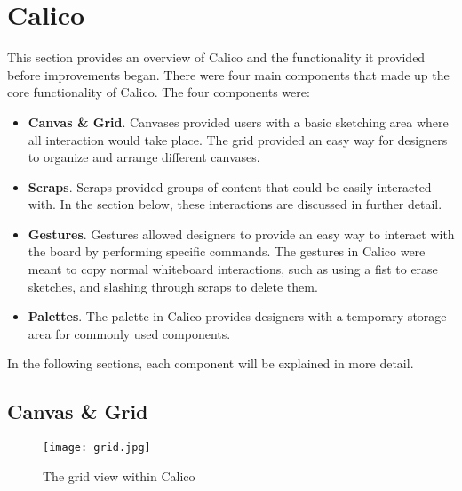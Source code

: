 \chapter{Calico}
This section provides an overview of Calico and the functionality it provided before improvements began. There were four main components that made up the core functionality of Calico. The four components were:

\begin{itemize}\itemsep1pt

\item
\textbf{Canvas \& Grid}. 
Canvases provided users with a basic sketching area where all interaction would take place. The grid provided an easy way for designers to organize and arrange different canvases.

\item
\textbf{Scraps}.
Scraps provided groups of content that could be easily interacted with. In the section below, these interactions are discussed in further detail.

\item
\textbf{Gestures}.
Gestures allowed designers to provide an easy way to interact with the board by performing specific commands. The gestures in Calico were meant to copy normal whiteboard interactions, such as using a fist to erase sketches, and slashing through scraps to delete them.

\item
\textbf{Palettes}.
The palette in Calico provides designers with a temporary storage area for commonly used components.


\end{itemize}

In the following sections, each component will be explained in more detail.


\section{Canvas \& Grid}

\begin{figure}[htb]
  \centering
  \texttt{[image: grid.jpg]}
  \caption{The grid view within Calico}
  \label{fig:grid}
\end{figure}


